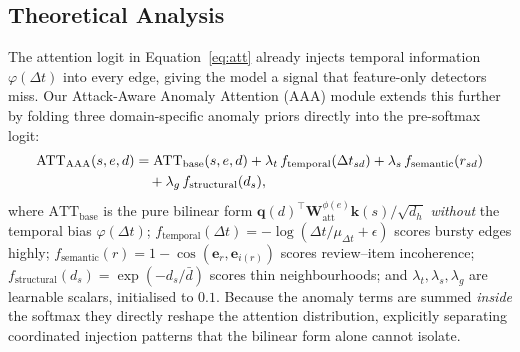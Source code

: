 \subsection{Theoretical Analysis}
\label{sec:theory}


The attention logit in Equation~\eqref{eq:att} already injects temporal
information $\varphi(\Delta t)$ into every edge, giving the model a signal
that feature-only detectors miss.
Our Attack-Aware Anomaly Attention (AAA) module extends this further by folding
three domain-specific anomaly priors directly into the pre-softmax logit:
\begin{align}
  \mathrm{ATT}_{\mathrm{AAA}}(s, e, d)
  &= \mathrm{ATT}_{\mathrm{base}}(s, e, d)
  + \lambda_t\, f_{\mathrm{temporal}}(\Delta t_{sd})
  + \lambda_s\, f_{\mathrm{semantic}}(r_{sd}) \notag \\
  &\quad + \lambda_g\, f_{\mathrm{structural}}(d_s),
  \label{eq:aaa}
\end{align}
where $\mathrm{ATT}_{\mathrm{base}}$ is the pure bilinear form
$\mathbf{q}(d)^{\!\top}\mathbf{W}_{\mathrm{att}}^{\phi(e)}\mathbf{k}(s)/\sqrt{d_h}$
\emph{without} the temporal bias $\varphi(\Delta t)$;
$f_{\mathrm{temporal}}(\Delta t) = -\log(\Delta t / \mu_{\Delta t} + \epsilon)$
scores bursty edges highly; $f_{\mathrm{semantic}}(r) = 1 - \cos(\mathbf{e}_r,
\mathbf{e}_{i(r)})$ scores review--item incoherence; $f_{\mathrm{structural}}(d_s)
= \exp(-d_s / \bar{d})$ scores thin neighbourhoods; and $\lambda_t, \lambda_s,
\lambda_g$ are learnable scalars, initialised to $0.1$.
Because the anomaly terms are summed \emph{inside} the softmax they directly
reshape the attention distribution, explicitly separating coordinated injection
patterns that the bilinear form alone cannot isolate.

